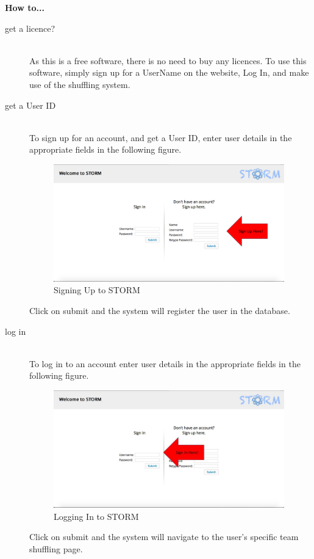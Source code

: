 {\Large \textbf{How to...} \par}

\begin{description}
 	\item[get a licence?] \hfill \\
 		As this is a free software, there is no need to buy any licences. To use this software, simply 
		sign up for a UserName on the website, Log In, and make use of the shuffling system.
 	\item[get a User ID] \hfill \\
		To sign up for an account, and get a User ID, enter user details in the appropriate fields in the 		following figure.\par
		 \begin{figure}[h!] 
		 \centering
		 \includegraphics[width=10cm]{./graphics/StormUMSU1.jpg}
		 \caption{Signing Up to STORM}
		 \end{figure}
   		Click on submit and the system will register the user in the database.
	\item[log in] \hfill \\
 		To log in to an account enter user details in the appropriate fields in the following figure.\par
   		\begin{figure}[h!] 
		\centering 
		\includegraphics[width=10cm]{./graphics/StormUMSU2.jpg}
		\caption{Logging In to STORM}
		\end{figure}
   		Click on submit and the system will navigate to the user's specific team shuffling page.

\end{description}
